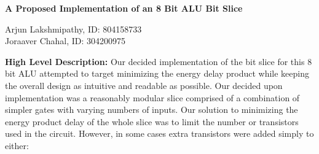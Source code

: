 \documentclass[12pt]{article}
\begin{document}
	\large \textbf{A Proposed Implementation of an 8 Bit ALU Bit Slice}
	\normalsize
	\begin{center}
		Arjun Lakshmipathy, ID: 804158733 \\
		Joraaver Chahal, ID: 304200975
	\end{center}
	\textbf{High Level Description:}
	\newline \newline
	Our decided implementation of the bit slice for this 8 bit ALU attempted to target
	minimizing the energy delay product while keeping the overall design as intuitive and 
	readable as possible. Our decided upon implementation was a reasonably modular 
	slice comprised of a combination of simpler gates with varying numbers of inputs. Our
	solution to minimizing the energy product delay of the whole slice was to limit the number
	or transistors used in the circuit. However, in some cases extra transistors were added
	simply to either:
	
\end{document}
